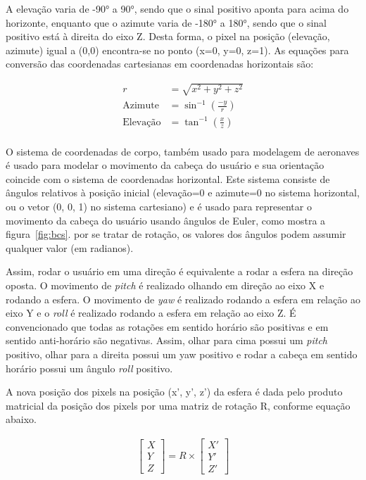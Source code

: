 A elevação varia de -90° a 90°, sendo que o sinal positivo aponta para acima do horizonte, enquanto que o azimute varia de -180° a 180°, sendo que o sinal positivo está à direita do eixo Z. Desta forma, o pixel na posição (elevação, azimute) igual a (0,0) encontra-se no ponto (x=0, y=0, z=1). As equações para conversão das coordenadas cartesianas em coordenadas horizontais são:

\begin{align}
        r &= \sqrt{x^2+y^2+z^2} \\
        \text{Azimute} &=\sin^{-1}\left(\frac{-y}{r}\right) \\
        \text{Elevação} &=\tan^{-1}\left(\frac{x}{z}\right)\\
        \label{eq:cart2hcs}
\end{align}


O sistema de coordenadas de corpo, também usado para modelagem de aeronaves é usado para modelar o movimento da cabeça do usuário e sua orientação coincide com o sistema de coordenadas horizontal. Este sistema consiste de ângulos relativos à posição inicial (elevação=0 e azimute=0 no sistema horizontal, ou o vetor (0, 0, 1) no sistema cartesiano) e é usado para representar o movimento da cabeça do usuário usando ângulos de Euler, como mostra a figura~\ref{fig:bcs}. por se tratar de rotação, os valores dos ângulos podem assumir qualquer valor (em radianos).

Assim, rodar o usuário em uma direção é equivalente a rodar a esfera na direção oposta. O movimento de \textit{pitch} é realizado olhando em direção ao eixo X e rodando a esfera. O movimento de \textit{yaw} é realizado rodando a esfera em relação ao eixo Y e o \textit{roll} é realizado rodando a esfera em relação ao eixo Z. É convencionado que todas as rotações em sentido horário são positivas e em sentido anti-horário são negativas. Assim, olhar para cima possui um \textit{pitch} positivo, olhar para a direita possui um yaw positivo e rodar a cabeça em sentido horário possui um ângulo \textit{roll} positivo.

A nova posição dos pixels na posição (x’, y’, z’) da esfera é dada pelo produto matricial da posição dos pixels por uma matriz de rotação R, conforme equação abaixo.

\begin{align*}
        \begin{bmatrix}
                X\\
                Y\\
                Z
        \end{bmatrix}
        =
        R \times
        \begin{bmatrix}
                X'\\
                Y'\\
                Z'
        \end{bmatrix}
\end{align*}

